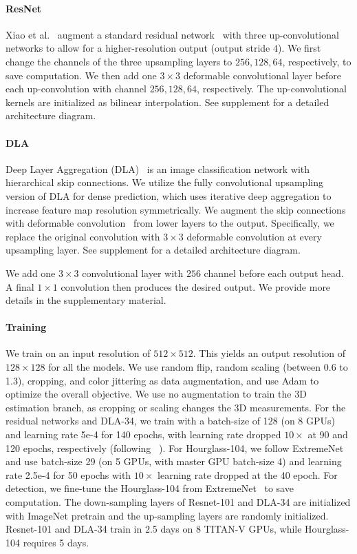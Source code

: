 \documentclass[10pt,twocolumn,letterpaper]{article}
\begin{document}
\paragraph{ResNet}
Xiao et al.~\cite{xiao2018simple} augment a standard residual network~\cite{he2016deep} with three up-convolutional networks to allow for a higher-resolution output (output stride $4$).
We first change the channels of the three upsampling layers to $256, 128, 64$, respectively, to save computation.
We then add one $3\times3$ deformable convolutional layer before each up-convolution with channel $256, 128, 64$, respectively.
The up-convolutional kernels are initialized as bilinear interpolation.
See supplement for a detailed architecture diagram.

\paragraph{DLA}
Deep Layer Aggregation (DLA)~\cite{yu2018deep} is an image classification network with hierarchical skip connections.
We utilize the fully convolutional upsampling version of DLA for dense prediction, 
which uses iterative deep aggregation to increase feature map resolution symmetrically. 
We augment the skip connections with deformable convolution~\cite{zhu2018deformable} from lower layers to the output.
Specifically, we replace the original convolution with $3\times3$ deformable convolution at every upsampling layer.
See supplement for a detailed architecture diagram.

We add one $3\times3$ convolutional layer with $256$ channel before each output head.
A final $1 \times 1$ convolution then produces the desired output.
We provide more details in the supplementary material.

\paragraph{Training}
We train on an input resolution of $512 \times 512$.
This yields an output resolution of $128 \times 128$ for all the models.
We use random flip, random scaling (between 0.6 to 1.3), cropping, and color jittering as data augmentation, and use Adam\cite{kingma2014adam} to optimize the overall objective.
We use no augmentation to train the 3D estimation branch, as cropping or scaling changes the 3D measurements.
For the residual networks and DLA-34, we train with a batch-size of 128 (on 8 GPUs) and learning rate 5e-4 for 140 epochs, with learning rate dropped $10 \times$ at 90 and 120 epochs, respectively (following ~\cite{xiao2018simple}).
For Hourglass-104, we follow ExtremeNet~\cite{zhou2019bottomup} and use batch-size 29 (on 5 GPUs, with master GPU batch-size 4) and learning rate 2.5e-4 for 50 epochs with $10 \times$ learning rate dropped at the 40 epoch.
For detection, we fine-tune the Hourglass-104 from ExtremeNet~\cite{zhou2019bottomup} to save computation.
The down-sampling layers of Resnet-101 and DLA-34 are initialized with ImageNet pretrain and the up-sampling layers are randomly initialized.
Resnet-101 and DLA-34 train in 2.5 days on 8 TITAN-V GPUs, while Hourglass-104 requires 5 days.
\end{document}
